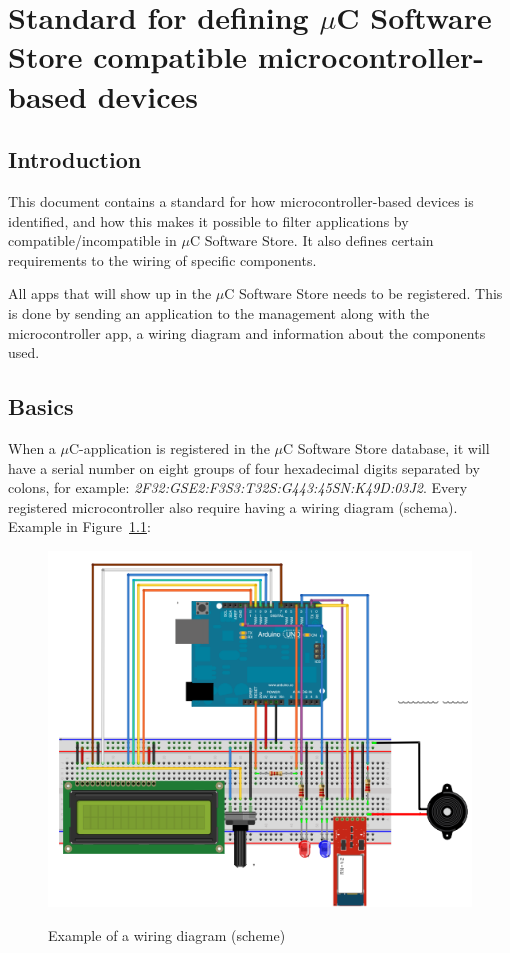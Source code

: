 \chapter{Standard for defining $\mu$C Software Store compatible microcontroller-based devices}
\label{microcontroller_standard}
\section{Introduction}
This document contains a standard for how microcontroller-based devices is identified, and how this makes it possible to filter applications by compatible/incompatible in $\mu$C Software Store. It also defines certain requirements to the wiring of specific components.

All apps that will show up in the $\mu$C Software Store needs to be registered. This is done by sending an application to the management along with the microcontroller app, a wiring diagram and information about the components used.

\section{Basics}
When a $\mu$C-application is registered in the $\mu$C Software Store database, it will have a serial number on eight groups of four hexadecimal digits separated by colons, for example: \textit{2F32:GSE2:F3S3:T32S:G443:45SN:K49D:03J2}. Every registered microcontroller also require having a wiring diagram (schema). Example in Figure~\ref{fig:wiring_simple}:

\begin{figure}[H]
\caption{Example of a wiring diagram (scheme)}
\centering
\includegraphics[scale=0.8]{images/wiring_diagram.png}
\label{fig:wiring_simple}
\end{figure}

